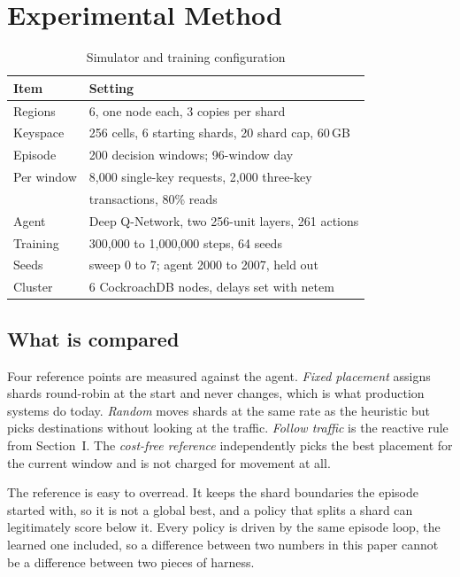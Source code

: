 \section{Experimental Method}

\begin{table}[t]
\caption{Simulator and training configuration}
\label{tab:config}
\centering
\footnotesize
\begin{tabular}{ll}
\toprule
Item & Setting \\
\midrule
Regions   & 6, one node each, 3 copies per shard \\
Keyspace  & 256 cells, 6 starting shards, 20 shard cap, 60\,GB \\
Episode   & 200 decision windows; 96-window day \\
Per window & 8{,}000 single-key requests, 2{,}000 three-key \\
          & transactions, 80\% reads \\
Agent     & Deep Q-Network, two 256-unit layers, 261 actions \\
Training  & 300{,}000 to 1{,}000{,}000 steps, 64 seeds \\
Seeds     & sweep 0 to 7; agent 2000 to 2007, held out \\
Cluster   & 6 CockroachDB nodes, delays set with netem \\
\bottomrule
\end{tabular}
\end{table}

\subsection{What is compared}

Four reference points are measured against the agent. \emph{Fixed placement}
assigns shards round-robin at the start and never changes, which is what
production systems do today. \emph{Random} moves shards at the same rate as
the heuristic but picks destinations without looking at the traffic.
\emph{Follow traffic} is the reactive rule from Section~I. The \emph{cost-free
reference} independently picks the best placement for the current window and
is not charged for movement at all.

The reference is easy to overread. It keeps the shard boundaries the episode
started with, so it is not a global best, and a policy that splits a shard can
legitimately score below it. Every policy is driven by the same episode loop,
the learned one included, so a difference between two numbers in this paper
cannot be a difference between two pieces of harness.


